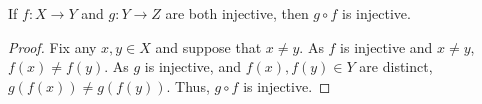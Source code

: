 \guard





\begin{prop}
\label{prop:compositionOfInjectionIsInjection}
  If $f:X\to Y$ and $g:Y\to Z$ are both injective, then $g\circ f$ is injective.
\end{prop}
\begin{proof}
  Fix any $x,y\in X$ and suppose that $x\not=y$.
  As $f$ is injective and $x\not=y$, $f(x)\not=f(y)$.
  As $g$ is injective, and $f(x),f(y)\in Y$ are distinct, $g(f(x))\not= g(f(y))$.
  Thus, $g\circ f$ is injective.
\end{proof}
